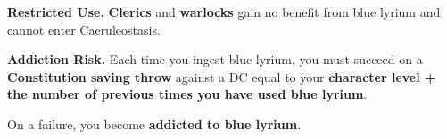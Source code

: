 \textbf{Restricted Use.}  
\textbf{Clerics} and \textbf{warlocks} gain no benefit from blue lyrium and cannot enter Caeruleostasis.

\textbf{Addiction Risk.}  
Each time you ingest blue lyrium, you must succeed on a \textbf{Constitution saving throw} against a DC equal to your \textbf{character level + the number of previous times you have used blue lyrium}.

On a failure, you become \textbf{addicted to blue lyrium}.

\subsection{}

\subsection{}

